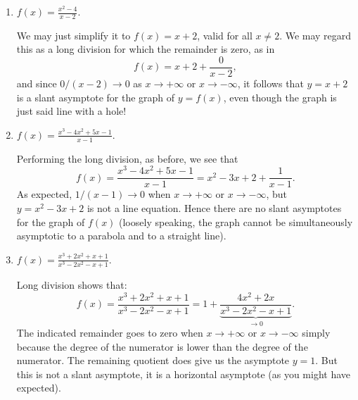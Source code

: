\documentclass{ximera}
\begin{document}
\begin{example}
\begin{enumerate}
  \item $f(x) = \frac{x^2-4}{x-2}$. \\[1em]
    \begin{explanation}
      We may just simplify it to $f(x) = x+2$, valid for all $x \neq 2$. We may regard this as a long division for which the remainder is zero, as in \[  f(x) = x+2+\frac{0}{x-2},  \]and since $0/(x-2) \to 0$ as $x\to +\infty$ or $x\to -\infty$, it follows that $y=x+2$ is a slant asymptote for the graph of $y=f(x)$, even though the graph is just said line with a hole!
      \begin{image}
      \end{image}      
    \end{explanation}
  \item $f(x)=\frac{x^3-4x^2+5x-1}{x-1}$. \\[1em]
    \begin{explanation}
      Performing the long division, as before, we see that \[   f(x) = \frac{x^3-4x^2+5x-1}{x-1} = x^2-3x+2 + \frac{1}{x-1}.  \]As expected, $1/(x-1) \to 0$ when $x \to +\infty$ or $x\to -\infty$, but $y=x^2-3x+2$ is not a line equation. Hence there are no slant asymptotes for the graph of $f(x)$ (loosely speaking, the graph cannot be simultaneously asymptotic to a parabola and to a straight line).
      \begin{image}
      \end{image}
    \end{explanation}
  \item $f(x) = \frac{x^3+2x^2+x+1}{x^3-2x^2-x+1}$. \\[1em]
   \begin{explanation}
      Long division shows that: \[   f(x) = \frac{x^3+2x^2+x+1}{x^3-2x^2-x+1} = 1 + \underbrace{\frac{4x^2+2x}{x^3-2x^2-x+1}}_{\to 0}.  \]The indicated remainder goes to zero when $x \to +\infty$ or $x\to -\infty$ simply because the degree of the numerator is lower than the degree of the numerator. The remaining quotient does give us the asymptote $y=1$. But this is not a slant asymptote, it is a horizontal asymptote (as you might have expected).

\end{explanation}
\end{enumerate}
\end{example}
\end{document}

